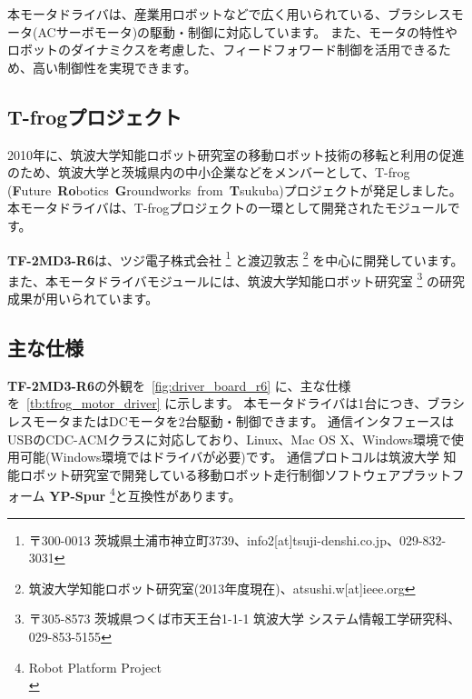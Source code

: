 \documentclass[11pt,a4j,openany,fleqn]{jbook}
\begin{document}
 本モータドライバは、産業用ロボットなどで広く用いられている、ブラシレスモータ(ACサーボモータ)の駆動・制御に対応しています。
また、モータの特性やロボットのダイナミクスを考慮した、フィードフォワード制御を活用できるため、高い制御性を実現できます。\par

\subsection{T-frogプロジェクト}
 2010年に、筑波大学知能ロボット研究室の移動ロボット技術の移転と利用の促進のため、筑波大学と茨城県内の中小企業などをメンバーとして、T-frog ({\bf{F}}uture~{\bf{Ro}}botics~{\bf{G}}roundworks~from~{\bf{T}}sukuba)プロジェクトが発足しました。
本モータドライバは、T-frogプロジェクトの一環として開発されたモジュールです。\par

{\bf TF-2MD3-R6}は、ツジ電子株式会社
\footnote{ 〒300-0013 茨城県土浦市神立町3739、info2[at]tsuji-denshi.co.jp、029-832-3031}
と渡辺敦志
\footnote{ 筑波大学知能ロボット研究室(2013年度現在)、atsushi.w[at]ieee.org}
を中心に開発しています。
また、本モータドライバモジュールには、筑波大学知能ロボット研究室
\footnote{ 〒305-8573 茨城県つくば市天王台1-1-1 筑波大学 システム情報工学研究科、029-853-5155}
の研究成果が用いられています。\par


\newpage
\subsection{主な仕様}
\label{sec:主な仕様}

{\bf TF-2MD3-R6}の外観を\figurename~\ref{fig:driver_board_r6} に、主な仕様を\tablename~\ref{tb:tfrog_motor_driver} に示します。
本モータドライバは1台につき、ブラシレスモータまたはDCモータを2台駆動・制御できます。
通信インタフェースはUSBのCDC-ACMクラスに対応しており、Linux、Mac OS X、Windows環境で使用可能(Windows環境ではドライバが必要)です。
通信プロトコルは筑波大学 知能ロボット研究室で開発している移動ロボット走行制御ソフトウェアプラットフォーム {\bf YP-Spur} \footnote{Robot Platform Project \\ }と互換性があります。\par
\end{document}
